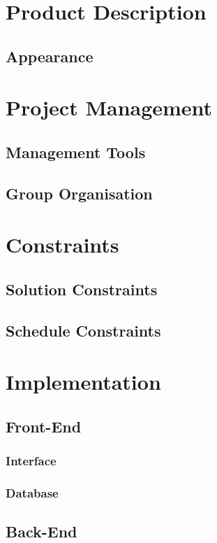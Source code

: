 \documentclass[11pt]{report}
\begin{document}
\section{Product Description}
\subsection{Appearance}

\section{Project Management}
\subsection{Management Tools}
\subsection{Group Organisation}

\section{Constraints}
\subsection{Solution Constraints}
\subsection{Schedule Constraints}

\section{Implementation}
\subsection{Front-End}
\subsubsection{Interface}
\subsubsection{Database}

\subsection{Back-End}
\end{document}
